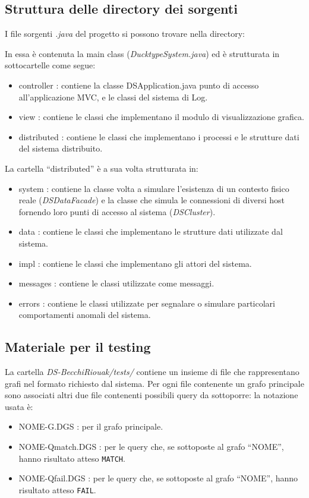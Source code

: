 \subsection{Struttura delle directory dei sorgenti}
\label{sec:directory}
I file sorgenti \emph{.java} del progetto si possono trovare nella directory:


In essa è contenuta la main class (\emph{DucktypeSystem.java})
ed è strutturata in sottocartelle come segue:
\begin{itemize}
\item controller : contiene la classe DSApplication.java punto di accesso
  all'applicazione MVC, e le classi del sistema di Log.
\item view : contiene le classi che implementano il modulo di visualizzazione grafica.
\item distributed : contiene le classi che implementano i processi e le strutture
  dati del sistema distribuito.
\end{itemize}

La cartella ``distributed'' è a sua volta strutturata in:
\begin{itemize}
\item system : contiene la classe volta a simulare l'esistenza di un
  contesto fisico reale (\emph{DSDataFacade})
  e la classe che simula le connessioni di diversi host
  fornendo loro punti di accesso al sistema (\emph{DSCluster}).
\item data : contiene le classi che implementano le strutture dati
  utilizzate dal sistema.
\item impl : contiene le classi che implementano gli attori del sistema.
\item messages : contiene le classi utilizzate come messaggi.
\item errors : contiene le classi utilizzate per segnalare o simulare
  particolari comportamenti anomali del sistema.
\end{itemize}

\subsection{Materiale per il testing}
La cartella \emph{DS-BecchiRiouak/tests/} contiene un insieme di file che
rappresentano grafi nel formato richiesto dal sistema.
Per ogni file contenente un grafo principale sono associati
altri due file contenenti possibili query da sottoporre: la notazione
usata è:
\begin{itemize}
\item NOME-G.DGS : per il grafo principale.
\item NOME-Qmatch.DGS : per le query che, se sottoposte al grafo ``NOME'',
  hanno risultato atteso \texttt{MATCH}.
\item NOME-Qfail.DGS : per le query che, se sottoposte al grafo ``NOME'',
  hanno risultato atteso \texttt{FAIL}.
\end{itemize}

